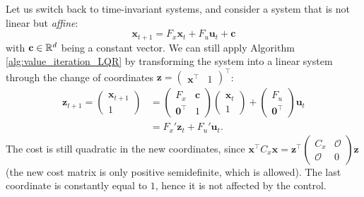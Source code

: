 \documentclass[10pt, a4paper]{report}
\begin{document}
\noindent Let us switch back to time-invariant systems, and consider a system that is not linear but \textit{affine}:\begin{equation}
    \mathbf x_{t+1}=F_x\mathbf x_t+F_u\mathbf u_t +\mathbf c
\end{equation}
with $\mathbf c\in{\mathbb R}^d$ being a constant vector. We can still apply Algorithm \ref{alg:value_iteration_LQR} by transforming the system into a linear system through the change of coordinates $\mathbf z = \begin{pmatrix}
        \mathbf x^\top & 1 
    \end{pmatrix}^\top$:
\begin{align}
    \mathbf z_{t+1} = \begin{pmatrix}
        \mathbf x_{t+1} \\ 1 
    \end{pmatrix}&=\begin{pmatrix}
        F_x&\mathbf c\\ 
        \mathbf 0^\top & 1
    \end{pmatrix}\begin{pmatrix}
        \mathbf x_t \\ 1 
    \end{pmatrix}+\begin{pmatrix}
        F_u \\ \mathbf 0^\top
    \end{pmatrix}\mathbf u_t \\[1.5ex]  &= F_x'\mathbf z_t+F_u'\mathbf u_t.
\end{align}
The cost is still quadratic in the new coordinates, since $\mathbf x^\top C_x\mathbf x=\mathbf z^\top\begin{pmatrix}
        C_x&\mathcal O\\ 
        \mathcal O & 0
    \end{pmatrix}\mathbf z$ (the new cost matrix is only positive semidefinite, which is allowed). The last coordinate is constantly equal to $1$, hence it is not affected by the control.
\end{document}
